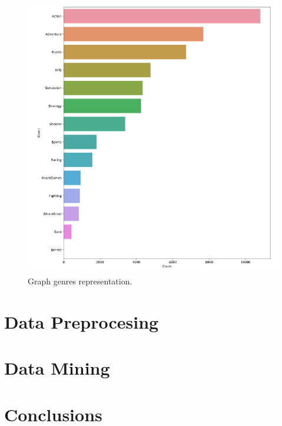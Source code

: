 \documentclass{book}
\begin{document}
    \begin{figure}[H]\label{fig:plotGenre}
        \centering
        \includegraphics{plot-genres}
        \caption{Graph genres representation.}
    \end{figure}

    \chapter{Data Preprocesing}
    \chapter{Data Mining}
    \chapter{Conclusions}

    \listoftables
    \listoffigures
\end{document}

